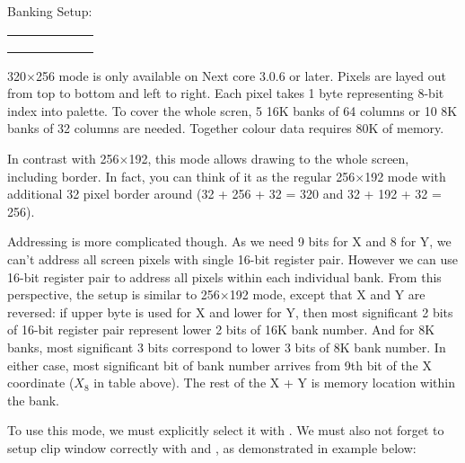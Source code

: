 \begin{multicols}{2}
    Banking Setup:

    \begin{tabularx}{0.445\textwidth}{|c|c|c|c|c|Y|}
        \hline
         &
             &
             &
             &
             &
             \\
        \hline
         & 
             &
             \\
        \hline
         &
             &
             \\
        \hline
         &
             &
             \\
        \hline
    \end{tabularx}
\end{multicols}

320$\times$256 mode is only available on Next core 3.0.6 or later. Pixels are layed out from top to bottom and left to right. Each pixel takes 1 byte representing 8-bit index into palette. To cover the whole scren, 5 16K banks of 64 columns or 10 8K banks of 32 columns are needed. Together colour data requires 80K of memory.

In contrast with 256$\times$192, this mode allows drawing to the whole screen, including border. In fact, you can think of it as the regular 256$\times$192 mode with additional 32 pixel border around (32 + 256 + 32 = 320 and 32 + 192 + 32 = 256).

Addressing is more complicated though. As we need 9 bits for X and 8 for Y, we can't address all screen pixels with single 16-bit register pair. However we can use 16-bit register pair to address all pixels within each individual bank. From this perspective, the setup is similar to 256$\times$192 mode, except that X and Y are reversed: if upper byte is used for X and lower for Y, then most significant 2 bits of 16-bit register pair represent lower 2 bits of 16K bank number. And for 8K banks, most significant 3 bits correspond to lower 3 bits of 8K bank number. In either case, most significant bit of bank number arrives from 9th bit of the X coordinate ($X_8$ in table above). The rest of the X + Y is memory location within the bank.

To use this mode, we must explicitly select it with . We must also not forget to setup clip window correctly with  and , as demonstrated in example below:


